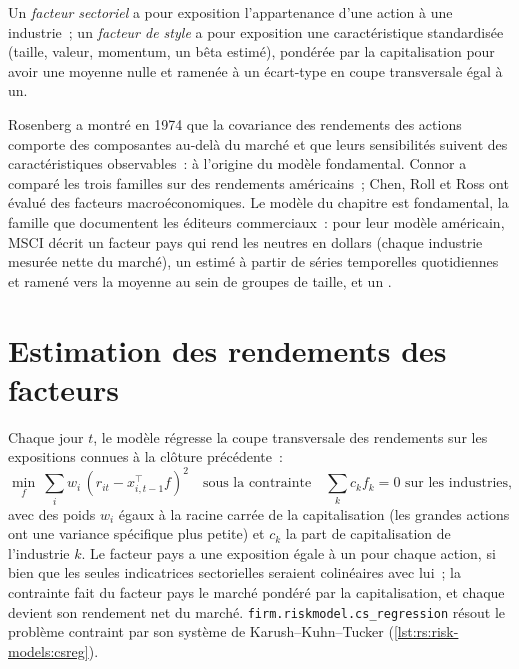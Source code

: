 \begin{definition}\label{def:rs:risk-models:style}
Un \emph{facteur sectoriel} a pour exposition l'appartenance d'une action à une industrie~; un \emph{facteur de style} a pour exposition une
caractéristique standardisée (taille, valeur, momentum, un bêta estimé), pondérée par la capitalisation pour avoir une moyenne nulle et ramenée à un écart-type en coupe transversale égal à un.
\end{definition}

Rosenberg a montré en 1974 que la covariance des rendements des actions comporte des composantes au-delà du marché et que leurs sensibilités suivent des caractéristiques observables~:
à l'origine du modèle fondamental. Connor a comparé les trois familles sur des rendements américains~; Chen, Roll et Ross ont évalué des facteurs macroéconomiques. Le modèle du chapitre
est fondamental, la famille que documentent les éditeurs commerciaux~: pour leur modèle américain, MSCI décrit un facteur pays qui rend les  neutres en dollars
(chaque industrie mesurée nette du marché), un  estimé à partir de séries temporelles quotidiennes et ramené vers la moyenne au sein de groupes de taille, et un .

\section{Estimation des rendements des facteurs}

Chaque jour $t$, le modèle régresse la coupe transversale des rendements sur les expositions connues à la clôture précédente~:
\[
\min_{f}\ \sum_i w_i\,(r_{it} - x_{i,t-1}^\top f)^2 \quad\text{sous la contrainte}\quad \sum_k c_k f_{k} = 0 \text{ sur les industries},
\]
avec des poids $w_i$ égaux à la racine carrée de la capitalisation (les grandes actions ont une variance spécifique plus petite) et $c_k$ la part de capitalisation de l'industrie $k$. Le
facteur pays a une exposition égale à un pour chaque action, si bien que les seules indicatrices sectorielles seraient colinéaires avec lui~; la contrainte fait du facteur pays le
marché pondéré par la capitalisation, et chaque  devient son rendement net du marché. \texttt{firm.riskmodel.cs\_regression} résout le problème contraint par
son système de Karush--Kuhn--Tucker (\cref{lst:rs:risk-models:csreg}).

